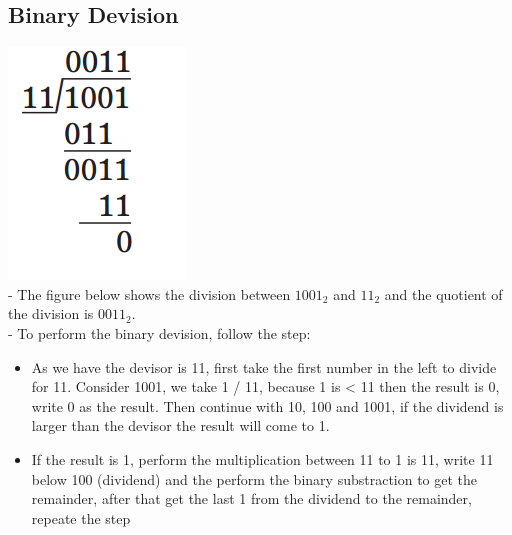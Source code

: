 \documentclass[12pt]{article}
\begin{document}
\subsection{Binary Devision}
 \includegraphics[scale = 0.6]{hinh31} \\
 - The figure below shows the division between $1001_{2}$ and $11_{2}$ and the quotient of the division is $0011_{2}$. \\
 - To perform the binary devision, follow the step: \\
 \begin{itemize}
 	\item As we have the devisor is 11, first take the first number in the left to divide for 11. Consider 1001, we take 1 / 11, because 1 is < 11 then the result is 0, write 0 as the result. Then continue with 10, 100 and 1001, if the dividend is larger than the devisor the result will come to 1.
 	\item If the result is 1, perform the multiplication between 11 to 1 is 11, write 11 below 100 (dividend) and the perform the binary substraction to get the remainder, after that get the last 1 from the dividend to the remainder, repeate the step
\end{itemize}
\end{document}
